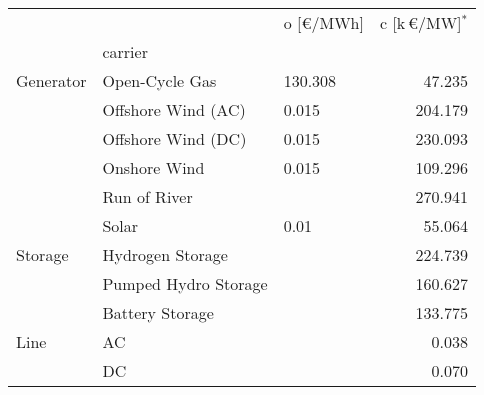 \begin{tabular}{lllr}
\toprule
     &    & o [\euro/MWh] &  c [k\,\euro/MW]$^*$ \\
{} & carrier &               &                      \\
\midrule
Generator & Open-Cycle Gas &       130.308 &               47.235 \\
     & Offshore Wind (AC) &         0.015 &              204.179 \\
     & Offshore Wind (DC) &         0.015 &              230.093 \\
     & Onshore Wind &         0.015 &              109.296 \\
     & Run of River &               &              270.941 \\
     & Solar &          0.01 &               55.064 \\
Storage & Hydrogen Storage &               &              224.739 \\
     & Pumped Hydro Storage &               &              160.627 \\
     & Battery Storage &               &              133.775 \\
Line & AC &               &                0.038 \\
     & DC &               &                0.070 \\
\bottomrule
\end{tabular}
